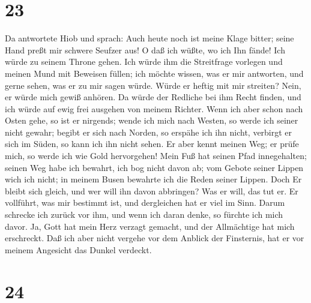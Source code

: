 \hypertarget{section-22}{%
\section{23}\label{section-22}}

 Da antwortete Hiob und sprach:  Auch heute
noch ist meine Klage bitter; seine Hand preßt mir schwere Seufzer aus!
 O daß ich wüßte, wo ich Ihn fände! Ich würde zu seinem
Throne gehen.  Ich würde ihm die Streitfrage vorlegen und
meinen Mund mit Beweisen füllen;  ich möchte wissen, was
er mir antworten, und gerne sehen, was er zu mir sagen würde.
 Würde er heftig mit mir streiten? Nein, er würde mich
gewiß anhören.  Da würde der Redliche bei ihm Recht
finden, und ich würde auf ewig frei ausgehen von meinem Richter.
 Wenn ich aber schon nach Osten gehe, so ist er nirgends;
wende ich mich nach Westen, so werde ich seiner nicht gewahr;
 begibt er sich nach Norden, so erspähe ich ihn nicht,
verbirgt er sich im Süden, so kann ich ihn nicht sehen. 
Er aber kennt meinen Weg; er prüfe mich, so werde ich wie Gold
hervorgehen!  Mein Fuß hat seinen Pfad innegehalten;
seinen Weg habe ich bewahrt, ich bog nicht davon ab;  vom
Gebote seiner Lippen wich ich nicht; in meinem Busen bewahrte ich die
Reden seiner Lippen.  Doch Er bleibt sich gleich, und wer
will ihn davon abbringen? Was er will, das tut er.  Er
vollführt, was mir bestimmt ist, und dergleichen hat er viel im Sinn.
 Darum schrecke ich zurück vor ihm, und wenn ich daran
denke, so fürchte ich mich davor.  Ja, Gott hat mein Herz
verzagt gemacht, und der Allmächtige hat mich erschreckt.
 Daß ich aber nicht vergehe vor dem Anblick der
Finsternis, hat er vor meinem Angesicht das Dunkel verdeckt.

\hypertarget{section-23}{%
\section{24}\label{section-23}}

